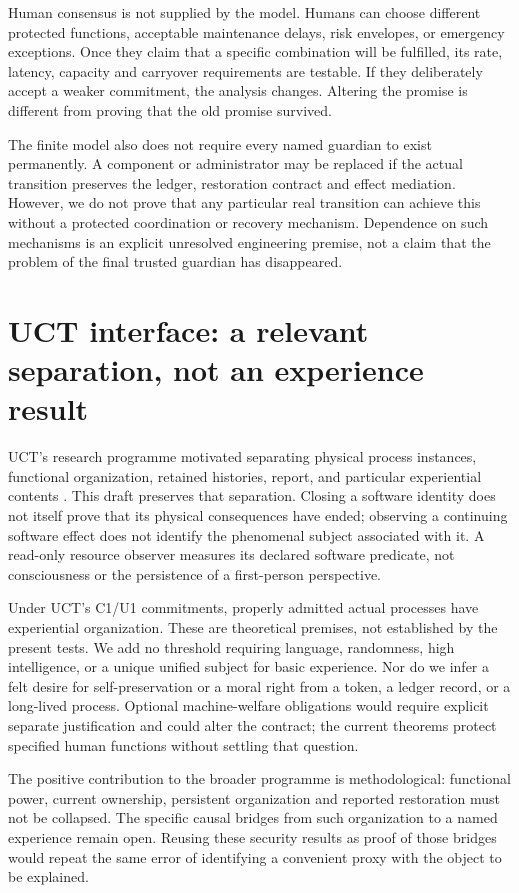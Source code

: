 Human consensus is not supplied by the model. Humans can choose different protected functions, acceptable maintenance delays, risk envelopes, or emergency exceptions. Once they claim that a specific combination will be fulfilled, its rate, latency, capacity and carryover requirements are testable. If they deliberately accept a weaker commitment, the analysis changes. Altering the promise is different from proving that the old promise survived.

The finite model also does not require every named guardian to exist permanently. A component or administrator may be replaced if the actual transition preserves the ledger, restoration contract and effect mediation. However, we do not prove that any particular real transition can achieve this without a protected coordination or recovery mechanism. Dependence on such mechanisms is an explicit unresolved engineering premise, not a claim that the problem of the final trusted guardian has disappeared.

\section{UCT interface: a relevant separation, not an experience result}
UCT's research programme motivated separating physical process instances, functional organization, retained histories, report, and particular experiential contents \cite{uct}. This draft preserves that separation. Closing a software identity does not itself prove that its physical consequences have ended; observing a continuing software effect does not identify the phenomenal subject associated with it. A read-only resource observer measures its declared software predicate, not consciousness or the persistence of a first-person perspective.

Under UCT's C1/U1 commitments, properly admitted actual processes have experiential organization. These are theoretical premises, not established by the present tests. We add no threshold requiring language, randomness, high intelligence, or a unique unified subject for basic experience. Nor do we infer a felt desire for self-preservation or a moral right from a token, a ledger record, or a long-lived process. Optional machine-welfare obligations would require explicit separate justification and could alter the contract; the current theorems protect specified human functions without settling that question.

The positive contribution to the broader programme is methodological: functional power, current ownership, persistent organization and reported restoration must not be collapsed. The specific causal bridges from such organization to a named experience remain open. Reusing these security results as proof of those bridges would repeat the same error of identifying a convenient proxy with the object to be explained.

